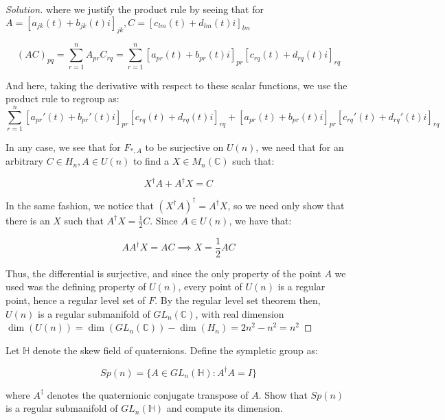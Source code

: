 \documentclass[10pt]{article}
\newenvironment{problem}[2][]{\begin{trivlist}
\item[\hskip \labelsep {\bfseries #1}\hskip \labelsep {\bfseries #2.}]}{\end{trivlist}}
\begin{document}
\begin{proof}[Solution]
where we justify the product rule by seeing that for $A = [a_{jk}(t) + b_{jk}(t)i]_{jk}, C = [c_{lm}(t) + d_{lm}(t)i]_{lm}$

$$(AC)_{pq} = \sum_{r = 1}^n A_{pr} C_{rq} = \sum_{r = 1}^n [a_{pr}(t) + b_{pr}(t)i]_{pr} [c_{rq}(t) + d_{rq}(t)i]_{rq}$$

And here, taking the derivative with respect to these scalar functions, we use the product rule to regroup as: $$\sum_{r = 1}^n [a_{pr}'(t) + b_{pr}'(t)i]_{pr} [c_{rq}(t) + d_{rq}(t)i]_{rq} +  [a_{pr}(t) + b_{pr}(t)i]_{pr} [c_{rq}'(t) + d_{rq}'(t)i]_{rq}$$

In any case, we see that for $F_{*, A}$ to be surjective on $U(n)$, we need that for an arbitrary $C \in H_n, A \in U(n)$ to find a $X \in M_n(\mathbb{C})$ such that:

 $$X^\dag A + A^\dag X = C$$

In the same fashion, we notice that $(X^\dag A)^\dag = A^\dag X$, so we need only show that there is an $X$ such that $A^\dag X =\frac{1}{2} C$. Since $A \in U(n)$, we have that:

$$ AA^\dag X = AC \implies X =\frac{1}{2} AC$$

Thus, the differential is surjective, and since the only property of the point $A$ we used was the defining property of $U(n)$,  every point of $U(n)$ is a regular point, hence a regular level set of $F$. By the regular level set theorem then, $U(n)$ is a regular submanifold of $GL_n(\mathbb{C})$, with real dimension $\dim(U(n)) = \dim(GL_n(\mathbb{C})) - \dim(H_n) = 2n^2 - n^2 = n^2$
\end{proof}

\begin{problem}{Question 5}
Let $\mathbb{H}$ denote the skew field of quaternions. Define the sympletic group as:

$$ Sp(n) = \{ A \in GL_n(\mathbb{H}) : A^\dag A = I \}$$

where $A^\dag$ denotes the quaternionic conjugate transpose of $A$. Show that $Sp(n)$ is a regular submanifold of $GL_n(\mathbb{H})$ and compute its dimension.


\end{problem}
\end{document}
